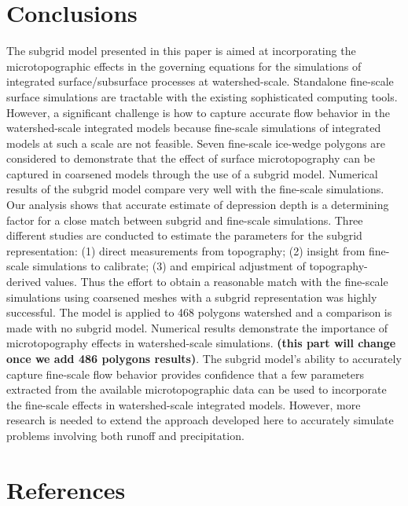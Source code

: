 \documentclass[review,11pt]{elsarticle}
\begin{document}
\section{Conclusions}\label{conclusion}

The subgrid model presented in this paper is aimed at incorporating the microtopographic effects in the governing equations for the simulations of integrated surface/subsurface processes at watershed-scale. Standalone fine-scale surface simulations are tractable with the existing sophisticated computing tools. However, a significant challenge is how to capture accurate flow behavior in the watershed-scale integrated models because fine-scale simulations of integrated models at such a scale are not feasible.
Seven fine-scale ice-wedge polygons are considered to demonstrate that the effect of surface microtopography can be captured in coarsened models through the use of a subgrid model. Numerical results of the subgrid model compare very well with the fine-scale simulations. Our analysis shows that accurate estimate of depression depth is a determining factor for a close match between subgrid and fine-scale simulations.
Three different studies are conducted to estimate the parameters for the subgrid representation: (1) direct measurements from topography; (2) insight from fine-scale simulations to calibrate; (3) and empirical adjustment of topography-derived values. 
Thus the effort to obtain a reasonable match with the fine-scale simulations using coarsened meshes with a subgrid representation was highly successful. The model is applied to 468 polygons watershed and a comparison is made with no subgrid model. Numerical results demonstrate the importance of microtopography effects in watershed-scale simulations. \textbf{(this part will change once we add 486 polygons results)}.
The subgrid model's ability to accurately capture fine-scale flow behavior provides confidence that a few parameters extracted from the available microtopographic data can be used to incorporate the fine-scale effects in watershed-scale integrated models.
However, more research is needed to extend the approach developed here to accurately simulate problems involving both runoff and precipitation.


\section*{References}


\end{document}
